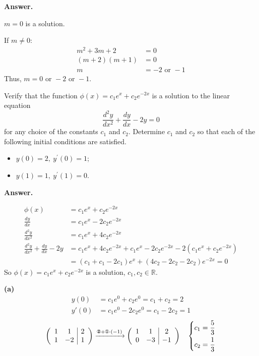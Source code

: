 \documentclass[12pt]{article}
\newenvironment{Answer}{%
  \par\medskip\noindent
  \begin{list}{}{%
    \setlength{\leftmargin}{0pt}%
    \setlength{\itemindent}{0pt}%
    \setlength{\listparindent}{0pt}%
  }%
  \item\relax
  \textbf{Answer.}\quad\ignorespaces
}{%
  \end{list}
  \par\medskip
}
\begin{document}
\begin{enumerate}[label=\textbf{\arabic*.}, leftmargin=*]
\begin{Answer}
  \(m = 0\) is a solution. \par
  \vspace{0.1em}
   If \(m \neq 0\): \quad
  \begin{align*}
    m^2 + 3m + 2 &= 0 \\[0.3em]
    (m+2)(m+1) &= 0 \\[0.3em]
    m &= -2 \text{ or } -1
  \end{align*}
  Thus, \(m = 0 \text{ or } -2 \text{ or } -1\).
  \end{Answer}

  \item[22.] Verify that the function $\phi(x)=c_{1}e^{x}+c_{2}e^{-2x}$ is a solution to the linear equation
  \[ \displaystyle \frac{d^{2}y}{dx^{2}}+\frac{dy}{dx}-2y=0 \]
  for any choice of the constants $c_{1}$ and $c_{2}$. Determine $c_{1}$ and $c_{2}$ so that each of the following initial conditions are satisfied.
  \begin{itemize}[leftmargin=*]
      \item[(a)] $y(0)=2,\ y^{\prime}(0)=1$;
      \item[(b)] $y(1)=1,\ y^{\prime}(1)=0$.
  \end{itemize}
  \begin{Answer}
  \begin{align*}
    \phi(x) &= c_1 e^x + c_2 e^{-2x} \\[0.3em]
    \displaystyle \frac{dy}{dx} &= c_1 e^x - 2c_2 e^{-2x} \\[0.3em]
    \displaystyle \frac{d^2y}{dx^2} &= c_1 e^x + 4c_2 e^{-2x} \\[0.4em]
    \displaystyle \frac{d^2y}{dx^2} + \frac{dy}{dx} - 2y &= c_1 e^x + 4c_2 e^{-2x} + c_1 e^x - 2c_2 e^{-2x} - 2(c_1 e^x + c_2 e^{-2x}) \\[0.3em]
    &= (c_1 + c_1 - 2c_1)e^x + (4c_2 - 2c_2 - 2c_2)e^{-2x} = 0
  \end{align*}
  So \(\phi(x) = c_1 e^x + c_2 e^{-2x}\) is a solution, \(c_1, c_2 \in \mathbb{R}\).

  \vspace{0.3em}
  \textbf{(a)} \quad
  \begin{align*}
    y(0) &= c_1 e^0 + c_2 e^0 = c_1 + c_2 = 2 \\[0.3em]
    y'(0) &= c_1 e^0 - 2c_2 e^0 = c_1 - 2c_2 = 1
  \end{align*}
  \[
  \left( \begin{array}{cc|c}
    1 & 1 & 2 \\
    1 & -2 & 1
  \end{array} \right)
  \xrightarrow{\text{\ding{173}} + \text{\ding{172}} \cdot (-1)}
  \left( \begin{array}{cc|c}
    1 & 1 & 2 \\
    0 & -3 & -1
  \end{array} \right)
  \quad \left\{ \begin{aligned}
    c_1 &= \frac{5}{3} \\
    c_2 &= \frac{1}{3}
  \end{aligned} \right.
  \]


\end{Answer}
\end{enumerate}
\end{document}
